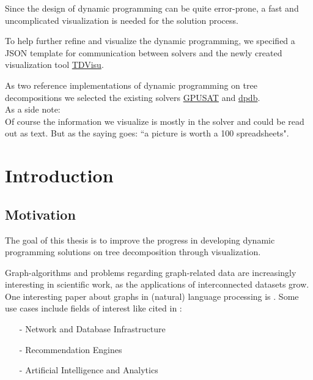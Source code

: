 \documentclass[a4paper, 12pt, bibliography=totoc]{scrartcl}
\begin{document}
Since the design of dynamic programming can be quite error-prone, a fast and uncomplicated visualization is needed for the solution process.

To help further refine and visualize the dynamic programming,
we specified a JSON template for communication between solvers and the newly created visualization tool \href{https://github.com/VaeterchenFrost/tdvisu}{TDVisu}.

As two reference implementations of dynamic programming on tree decompositions we selected the existing solvers \href{https://github.com/daajoe/GPUSAT}{GPUSAT} and \href{https://github.com/hmarkus/dp_on_dbs}{dpdb}.\\


As a side note: \\
Of course the information we visualize is mostly in the solver and could be read out as text. But as the saying goes: ``a picture is worth a 100 spreadsheets".


{\setlength{\textheight}{1.02\textheight}\newpage
	
\tableofcontents
}

\newpage


\section{Introduction}
\subsection{Motivation}

The goal of this thesis is to improve the progress in developing dynamic programming solutions on tree decomposition through visualization.

Graph-algorithms and problems regarding graph-related data are increasingly interesting in scientific work, as the applications of interconnected datasets grow. One interesting paper about graphs in (natural) language processing is \cite{jones-etal-2013-modeling}.
Some use cases include fields of interest like cited in \cite{graphUseCases}: %
\begin{itemize}
	\item[-] Network and Database Infrastructure
	\item[-] Recommendation Engines
	\item[-] Artificial Intelligence and Analytics
\end{itemize}
\end{document}
